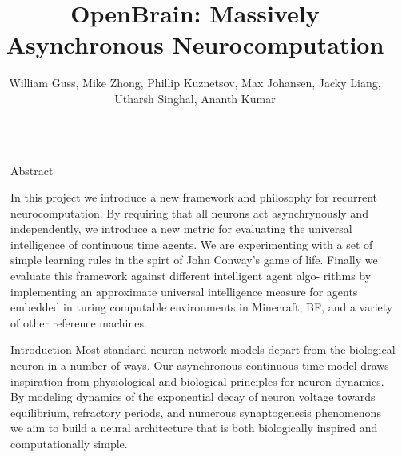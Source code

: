 \documentclass[final]{beamer}
\title{OpenBrain: Massively Asynchronous Neurocomputation} %
\author{William Guss, Mike Zhong, Phillip Kuznetsov, Max Johansen, Jacky Liang, Utharsh Singhal, Ananth Kumar} %
\institute{Machine Learning at Berkeley} %
\newlength{\sepwid}
\newlength{\onecolwid}
\begin{document}

\setlength{\belowcaptionskip}{2ex} %
\setlength\belowdisplayshortskip{2ex} %

\begin{frame}[t] %

\begin{columns}[t] %

\begin{column}{\sepwid}\end{column} %

\begin{column}{\onecolwid} %


\begin{alertblock}{Abstract}

In this project we introduce a new framework and philosophy for recurrent neurocomputation. By requiring that all neurons act asynchrynously and independently,
we introduce a new metric for evaluating the universal intelligence of continuous
time agents. We are experimenting with a set of simple learning rules in the spirt of John Conway's game of life. Finally we evaluate this framework against different intelligent agent algo-
rithms by implementing an approximate universal intelligence measure for agents
embedded in turing computable environments in Minecraft, BF, and a variety of
other reference machines.
\end{alertblock}


\begin{block}{Introduction}
Most standard neuron network models depart from the biological neuron in a number of ways. Our asynchronous continuous-time model draws inspiration from physiological and biological principles for neuron dynamics. By modeling dynamics of the exponential decay of neuron voltage towards equilibrium, refractory periods, and numerous synaptogenesis phenomenons we aim to build a neural architecture that is both biologically inspired and computationally simple. 
\end{block}


\end{column}
\end{columns}
\end{frame}
\end{document}
